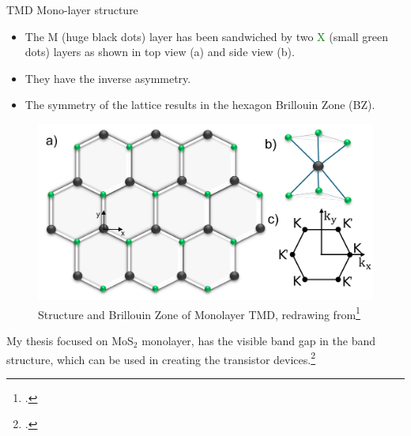 \documentclass{beamer}
\begin{document}
\begin{frame}{TMD Mono-layer structure}
\begin{multicols}{2}
	\begin{itemize}
\item The M (huge black dots) layer has been sandwiched by two \textcolor{green}{X} (small green dots) layers as shown in top view (a) and side view (b).\\
\item They have the inverse asymmetry.\\
\item The symmetry of the lattice results in the hexagon Brillouin Zone (BZ).
	\end{itemize}
	\columnbreak
	\vfill
	\begin{figure}
\label{Structure}
\includegraphics[width = \linewidth]{images/RS.pdf}
\caption{Structure and Brillouin Zone of Monolayer TMD, redrawing from\footcite{liu_three-band_2013}}
	\end{figure}
\end{multicols}
\quad My thesis focused on MoS$_2$ monolayer, has the visible band gap in the band structure, which can be used in creating the transistor devices.\footcite{radisavljevic_single-layer_2011}
\end{frame}
\end{document}
